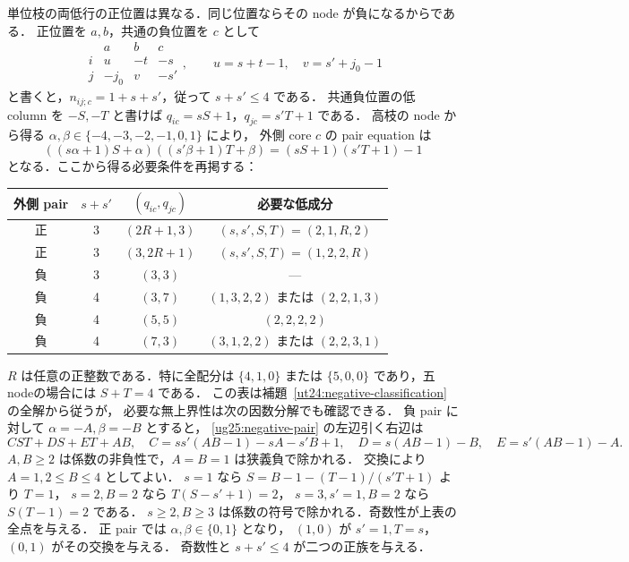 単位枝の両低行の正位置は異なる．同じ位置ならその node が負になるからである．
正位置を $a,b$，共通の負位置を $c$ として
\[
 \begin{array}{c|ccc}
 &a&b&c\\\hline
 i&u&-t&-s\\
 j&-j_0&v&-s'
 \end{array},\qquad
 u=s+t-1,\quad v=s'+j_0-1
\]
と書くと，$n_{ij;c}=1+s+s'$，従って $s+s'\le4$ である．
共通負位置の低 column を $-S,-T$ と書けば
$q_{ic}=sS+1$，$q_{jc}=s'T+1$ である．
高枝の node から得る $\alpha,\beta\in\{-4,-3,-2,-1,0,1\}$ により，
外側 core $c$ の pair equation は
\begin{equation}\label{ug25:negative-pair}
 ((s\alpha+1)S+\alpha)((s'\beta+1)T+\beta)
 =(sS+1)(s'T+1)-1
\end{equation}
となる．ここから得る必要条件を再掲する：
\begin{center}\small
\begin{tabular}{c|c|c|c}
外側 pair&$s+s'$&$(q_{ic},q_{jc})$&必要な低成分\\\hline
正&3&$(2R+1,3)$&$(s,s',S,T)=(2,1,R,2)$\\
正&3&$(3,2R+1)$&$(s,s',S,T)=(1,2,2,R)$\\
負&3&$(3,3)$&---\\
負&4&$(3,7)$&$(1,3,2,2)$ または $(2,2,1,3)$\\
負&4&$(5,5)$&$(2,2,2,2)$\\
負&4&$(7,3)$&$(3,1,2,2)$ または $(2,2,3,1)$
\end{tabular}
\end{center}
$R$ は任意の正整数である．特に全配分は $\{4,1,0\}$ または
$\{5,0,0\}$ であり，五nodeの場合には $S+T=4$ である．
この表は補題~\ref{ut24:negative-classification} の全解から従うが，
必要な無上界性は次の因数分解でも確認できる．
負 pair に対して $\alpha=-A,\beta=-B$ とすると，
\eqref{ug25:negative-pair} の左辺引く右辺は
\[
 CST+DS+ET+AB,
 \quad C=ss'(AB-1)-sA-s'B+1,
 \quad D=s(AB-1)-B,
 \quad E=s'(AB-1)-A.
\]
$A,B\ge2$ は係数の非負性で，$A=B=1$ は狭義負で除かれる．
交換により $A=1,2\le B\le4$ としてよい．
$s=1$ なら $S=B-1-(T-1)/(s'T+1)$ より $T=1$，
$s=2,B=2$ なら $T(S-s'+1)=2$，
$s=3,s'=1,B=2$ なら $S(T-1)=2$ である．
$s\ge2,B\ge3$ は係数の符号で除かれる．奇数性が上表の全点を与える．
正 pair では $\alpha,\beta\in\{0,1\}$ となり，
$(1,0)$ が $s'=1,T=s$，$(0,1)$ がその交換を与える．
奇数性と $s+s'\le4$ が二つの正族を与える．

